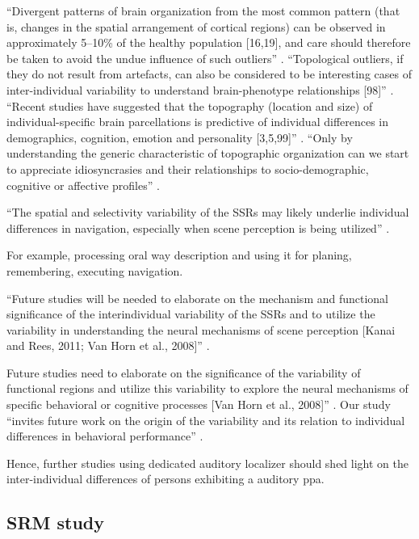%
``Divergent patterns of brain organization from the most common pattern (that
is, changes in the spatial arrangement of cortical regions) can be observed in
approximately 5–10\% of the healthy population [16,19], and care should
therefore be taken to avoid the undue influence of such outliers''
\citep{eickhoff2018imaging}.
%
``Topological outliers, if they do not result from artefacts, can also be
considered to be interesting cases of inter-individual variability to understand
brain-phenotype relationships [98]'' \citep{eickhoff2018imaging}.
%
``Recent studies have suggested that the topography (location and size)
of individual-specific brain parcellations is predictive of individual
differences in demographics, cognition, emotion and personality [3,5,99]''
\citep{eickhoff2018imaging}.
%
``Only by understanding the generic characteristic of topographic organization
can we start to appreciate idiosyncrasies and their relationships to
socio-demographic, cognitive or affective profiles''
\citep{eickhoff2018imaging}.

``The spatial and selectivity variability of the SSRs may likely underlie
individual differences in navigation, especially when scene perception is being
utilized'' \citep{zhen2017quantifying}.

%
For example, processing oral way description and using it for planing,
remembering, executing navigation.

%
``Future studies will be needed to elaborate on the mechanism and functional
significance of the interindividual variability of the SSRs and to utilize the
variability in understanding the neural mechanisms of scene perception [Kanai
and Rees, 2011; Van Horn et al., 2008]'' \citep{zhen2017quantifying}.

%
Future studies need to elaborate on the significance of the variability of
functional regions and utilize this variability to explore the neural mechanisms
of specific behavioral or cognitive processes [Van Horn et al., 2008]''
\citep{zhen2015quantifying}.
%
Our study ``invites future work on the origin of the variability and its
relation to individual differences in behavioral performance''
\citep{zhen2015quantifying}.

%
Hence, further studies using dedicated auditory localizer should shed light on
the inter-individual differences of persons exhibiting a auditory \ac{ppa}.



\subsection{SRM study}

